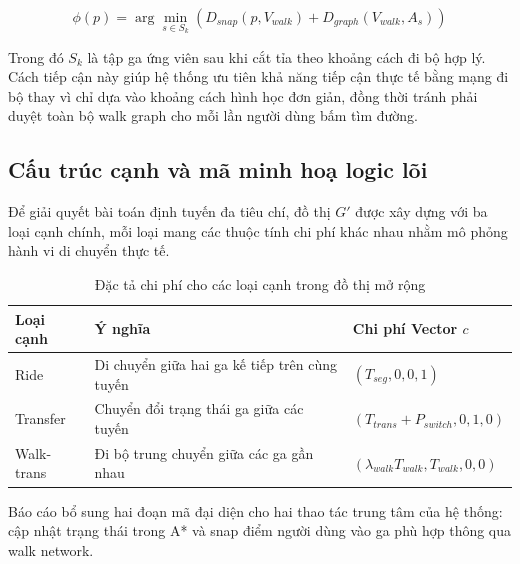 \documentclass[../DoAn.tex]{subfiles}
\begin{document}
\[
\phi(p) = \arg\min_{s \in S_k} \left(D_{snap}(p, V_{walk}) + D_{graph}(V_{walk}, A_s)\right)
\]

Trong đó \(S_k\) là tập ga ứng viên sau khi cắt tỉa theo khoảng cách đi bộ hợp lý. Cách tiếp cận này giúp hệ thống ưu tiên khả năng tiếp cận thực tế bằng mạng đi bộ thay vì chỉ dựa vào khoảng cách hình học đơn giản, đồng thời tránh phải duyệt toàn bộ walk graph cho mỗi lần người dùng bấm tìm đường.

\subsection{Cấu trúc cạnh và mã minh hoạ logic lõi}
Để giải quyết bài toán định tuyến đa tiêu chí, đồ thị $G'$ được xây dựng với ba loại cạnh chính, mỗi loại mang các thuộc tính chi phí khác nhau nhằm mô phỏng hành vi di chuyển thực tế.

\begin{table}[H]
\centering
\small
\renewcommand{\arraystretch}{1.35}
\begin{tabular}{|>{\raggedright\arraybackslash}p{2.3cm}|>{\raggedright\arraybackslash}p{6.0cm}|>{\raggedright\arraybackslash}p{3.7cm}|}
\hline
\textbf{Loại cạnh} & \textbf{Ý nghĩa} & \textbf{Chi phí Vector $c$} \\
\hline
Ride & Di chuyển giữa hai ga kế tiếp trên cùng tuyến & $(T_{seg}, 0, 0, 1)$ \\
\hline
Transfer & Chuyển đổi trạng thái ga giữa các tuyến & $(T_{trans} + P_{switch}, 0, 1, 0)$ \\
\hline
Walk-trans & Đi bộ trung chuyển giữa các ga gần nhau & $(\lambda_{walk}T_{walk}, T_{walk}, 0, 0)$ \\
\hline
\end{tabular}
\caption{Đặc tả chi phí cho các loại cạnh trong đồ thị mở rộng}
\label{tab:edge-cost-types}
\end{table}

Báo cáo bổ sung hai đoạn mã đại diện cho hai thao tác trung tâm của hệ thống: cập nhật trạng thái trong A* và snap điểm người dùng vào ga phù hợp thông qua walk network.
\end{document}
